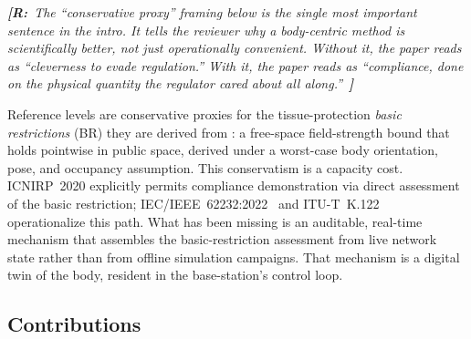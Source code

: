 \documentclass[journal,twocolumn,10pt]{IEEEtran}
\theoremstyle{definition}
\newcommand{\robinnote}[1]{%
  {\color{red!75!black}\textit{\textbf{[R:}~#1~\textbf{]}}}}
\begin{document}
\robinnote{The ``conservative proxy'' framing below is the single
most important sentence in the intro. It tells the reviewer why
a body-centric method is scientifically better, not just
operationally convenient. Without it, the paper reads as
``cleverness to evade regulation.'' With it, the paper reads as
``compliance, done on the physical quantity the regulator cared
about all along.''}

Reference levels are conservative proxies for the tissue-protection
\emph{basic restrictions} (BR) they are derived from
\cite{ICNIRP2020}: a free-space field-strength bound that holds
pointwise in public space, derived under a worst-case body
orientation, pose, and occupancy assumption. This conservatism
is a capacity cost. ICNIRP~2020 explicitly permits compliance
demonstration via direct assessment of the basic restriction;
IEC/IEEE~62232:2022~\cite{IEC62232} and
ITU-T~K.122~\cite{K122} operationalize this path. What has been
missing is an auditable, real-time mechanism that assembles the
basic-restriction assessment from live network state rather than
from offline simulation campaigns. That mechanism is a digital
twin of the body, resident in the base-station's control loop.

\subsection{Contributions}
\end{document}
